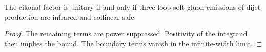 \begin{theorem}[Stability]\label{thm:1}
The eikonal factor is unitary if and only if three-loop soft gluon
emissions of dijet production are infrared and collinear safe.
\end{theorem}

\begin{proof}
The remaining terms are power suppressed. Positivity of the integrand
then implies the bound. The boundary terms vanish in the infinite-width
limit.
\end{proof}

